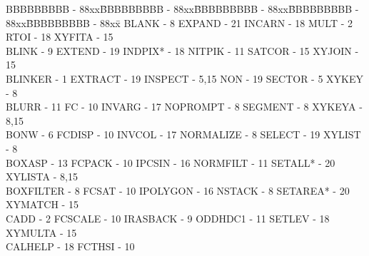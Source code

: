 {\begin{tabbing}
BBBBBBBBB - 88xx\=BBBBBBBBB - 88xx\=BBBBBBBBB - 88xx\=BBBBBBBBB - 88xx\=BBBBBBBBB - 88xx\=\kill
 BLANK - 8                               \>EXPAND - 21                           
   \>INCARN - 18                             \>
 MULT - 2                                \>RTOI - 18                             
   \>XYFITA - 15                             \\
 BLINK - 9                               \>EXTEND - 19                           
   \>INDPIX* - 18                            \>
 NITPIK - 11                             \>SATCOR - 15                           
   \>XYJOIN - 15                             \\
 BLINKER - 1                             \>EXTRACT - 19                          
   \>INSPECT - 5,15                          \>
 NON - 19                                \>SECTOR - 5                            
   \>XYKEY - 8                               \\
 BLURR - 11                              \>FC - 10                               
   \>INVARG - 17                             \>
 NOPROMPT - 8                            \>SEGMENT - 8                           
   \>XYKEYA - 8,15                           \\
 BONW - 6                                \>FCDISP - 10                           
   \>INVCOL - 17                             \>
 NORMALIZE - 8                           \>SELECT - 19                           
   \>XYLIST - 8                              \\
 BOXASP - 13                             \>FCPACK - 10                           
   \>IPCSIN - 16                             \>
 NORMFILT - 11                           \>SETALL* - 20                          
   \>XYLISTA - 8,15                          \\
 BOXFILTER - 8                           \>FCSAT - 10                            
   \>IPOLYGON - 16                           \>
 NSTACK - 8                              \>SETAREA* - 20                         
   \>XYMATCH - 15                            \\
 CADD - 2                                \>FCSCALE - 10                          
   \>IRASBACK - 9                            \>
 ODDHDC1 - 11                            \>SETLEV - 18                           
   \>XYMULTA - 15                            \\
 CALHELP - 18                            \>FCTHSI - 10                           

\end{tabbing}}
